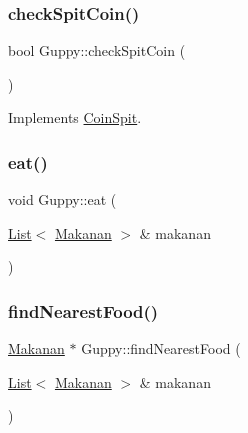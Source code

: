 \mbox{\label{class_guppy_abab3975de3a054b14aa3b8e664e30b5b}} 
\subsubsection{\texorpdfstring{check\+Spit\+Coin()}{checkSpitCoin()}}
{\footnotesize\ttfamily bool Guppy\+::check\+Spit\+Coin (\begin{DoxyParamCaption}{ }\end{DoxyParamCaption})\hspace{0.3cm}{\ttfamily [virtual]}}



Implements \mbox{\hyperlink{class_coin_spit_a9471108f825dc67a35ac1a35444b84fd}{Coin\+Spit}}.

\mbox{\label{class_guppy_a03f670d2a9f6a6a28d3028d806fda979}} 
\subsubsection{\texorpdfstring{eat()}{eat()}}
{\footnotesize\ttfamily void Guppy\+::eat (\begin{DoxyParamCaption}\item[{\mbox{\hyperlink{class_list}{List}}$<$ \mbox{\hyperlink{class_makanan}{Makanan}} $>$ \&}]{makanan }\end{DoxyParamCaption})}

\mbox{\label{class_guppy_accaa1f62989d00f7859f56848009089a}} 
\subsubsection{\texorpdfstring{find\+Nearest\+Food()}{findNearestFood()}}
{\footnotesize\ttfamily \mbox{\hyperlink{class_makanan}{Makanan}} $\ast$ Guppy\+::find\+Nearest\+Food (\begin{DoxyParamCaption}\item[{\mbox{\hyperlink{class_list}{List}}$<$ \mbox{\hyperlink{class_makanan}{Makanan}} $>$ \&}]{makanan }\end{DoxyParamCaption})}

